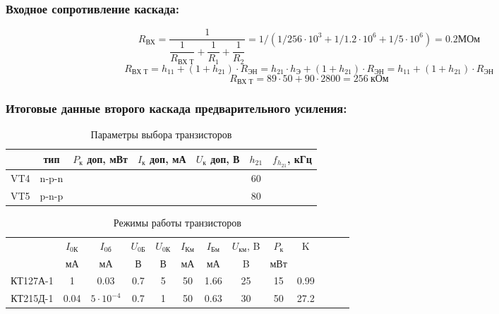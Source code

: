 \subsubsection{Входное сопротивление каскада:}
\begin{equation}
   \label{eq:equation6_22}
R_{\text{ВХ}}=\dfrac{1}{\dfrac{1}{R_\text{ВХ Т}}+\dfrac{1}{R_1}+\dfrac{1}{R_2}}=1/(1/256 \cdot 10^3 +1/1.2 \cdot 10^6 + 1/5 \cdot 10^6)=0.2\text{МОм}
\end{equation}
\begin{equation}
   \label{eq:equation6_23}
R_{\text{ВХ Т}}=h_{11}+(1+h_{21})\cdot R_{\text{ЭН}}=h_{21} \cdot h_{\text{Э}}+(1+h_{21}) \cdot R_{\text{ЭН}}=h_{11}+(1+h_{21}) \cdot R_{\text{ЭН}}
\end{equation}
\begin{equation*}
R_{\text{ВХ Т}}=89 \cdot 50+90 \cdot 2800 =256~\text{кОм}
\end{equation*}

\subsubsection{Итоговые данные второго каскада предварительного усиления:}


\begin{table}[htbp]
\caption{Параметры выбора транзисторов }
\begin{center}\begin{tabular}{|c|c|c|c|c|c|c|}
\hline 
  & тип & $P_{\text{к}}$ доп, мВт & $I_{\text{к}}$ доп, мА & $U_{\text{к}}$ доп, В & $h_{21}$ &  $f_{h_{21}}$, кГц \\ 
\hline 
VT4 & n-p-n &   &  &  & 60 & \\ 
\hline 
VT5 & p-n-p &   &  &  & 80 &  \\ 
\hline 
\end{tabular} 
\end{center}
\end{table}

\begin{table}[htbp]
\caption{Режимы работы транзисторов}
\begin{center}\begin{tabular}{|c|c|c|c|c|c|c|c|c|c|c|c|c|}
\hline 
   & $I_\text{0К}$ & $I_\text{0б}$& $U_\text{0Б}$ & $U_\text{0К}$&  $I_{\text{Км}}$  & $I_{\text{Бм}}$& $U_{\text{км}}$, B & $P_{\text{к}}$ & K\\ 
  & мА & мА& В & В & мА & мА & B & мВт & \\
\hline 
КТ127А-1 & 1 & 0.03 & 0.7 & 5 & 50 & 1.66 & 25 & 15 & 0.99 \\
\hline 
КТ215Д-1 & 0.04 & $5\cdot10^{-4}$  & 0.7 & 1 & 50 & 0.63 & 30 & 50 & 27.2 \\
\hline
\end{tabular} 
\end{center}
\end{table}

